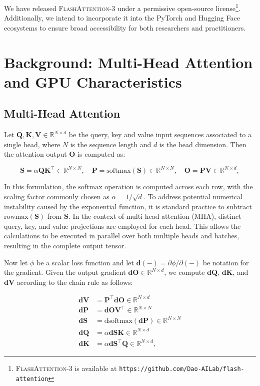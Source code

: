 \begin{enumerate}
We have released \textsc{FlashAttention-3} under a permissive open-source license\footnote{\textsc{FlashAttention-3}
  is available at \texttt{https://github.com/Dao-AILab/flash-attention}}. Additionally, we intend to incorporate it into the PyTorch and Hugging Face ecosystems to ensure broad accessibility for both researchers and practitioners.

\section{Background: Multi-Head Attention and GPU Characteristics}
\label{sec:background}

\subsection{Multi-Head Attention}
\label{subsec:multi_head_attn}

Let $\mathbf{Q}, \mathbf{K}, \mathbf{V} \in \mathbb{R}^{N \times d}$ be the query, key and value input sequences associated to a single head, where $N$ is the sequence length and $d$ is the head dimension. Then the attention output $\mathbf{O}$ is computed as:

\begin{equation*}
  \mathbf{S} = \alpha \mathbf{Q} \mathbf{K}^\top \in \mathbb{R}^{N \times N}, \quad \mathbf{P} = \mathrm{softmax}(\mathbf{S}) \in \mathbb{R}^{N \times N}, \quad \mathbf{O} = \mathbf{P}\mathbf{V} \in \mathbb{R}^{N \times d},
\end{equation*}

In this formulation, the $\mathrm{softmax}$ operation is computed across each row, with the scaling factor commonly chosen as $\alpha = 1/\sqrt{d}$. To address potential numerical instability caused by the exponential function, it is standard practice to subtract $\mathrm{rowmax}(\mathbf{S})$ from $\mathbf{S}$. In the context of multi-head attention (MHA), distinct query, key, and value projections are employed for each head. This allows the calculations to be executed in parallel over both multiple heads and batches, resulting in the complete output tensor.

Now let $\phi$ be a scalar loss function and let $\mathbf{d}(-) = \partial \phi / \partial (-)$ be notation for the gradient. Given the output gradient $\mathbf{dO} \in \mathbb{R}^{N \times d}$, we compute $\mathbf{dQ}$, $\mathbf{dK}$, and $\mathbf{dV}$ according to the chain rule as follows:

\begin{align*}
  \mathbf{dV} &= \mathbf{P}^\top \mathbf{dO} \in \mathbb{R}^{N \times d} \\
  \mathbf{dP} &= \mathbf{dO} \mathbf{V}^\top \in \mathbb{R}^{N \times N} \\
  \mathbf{dS} &= \mathrm{dsoftmax} (\mathbf{dP}) \in \mathbb{R}^{N \times N} \\
  \mathbf{dQ} &= \alpha \mathbf{dS} \mathbf{K} \in \mathbb{R}^{N \times d} \\
  \mathbf{dK} &= \alpha \mathbf{dS}^\top \mathbf{Q} \in \mathbb{R}^{N \times d},
\end{align*}


\end{enumerate}
